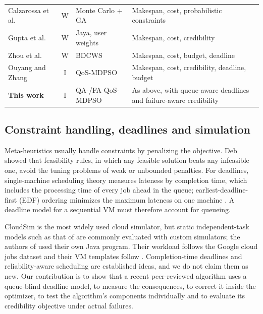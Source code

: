\documentclass[pdflatex,sn-basic]{sn-jnl}
\theoremstyle{thmstyleone}%
\theoremstyle{thmstyletwo}%
\theoremstyle{thmstylethree}%
\begin{document}
\begin{table}[!t]
\begin{tabular}{@{}p{2.9cm}cp{3.0cm}p{3.7cm}@{}}
Calzarossa et al.\ \citeyearpar{calzarossa2021} & W & Monte Carlo + GA & Makespan, cost, probabilistic constraints\\
Gupta et al.\ \citeyearpar{gupta2021} & W & Jaya, user weights & Makespan, cost, credibility\\
Zhou et al.\ \citeyearpar{zhou2023} & W & BDCWS & Makespan, cost, budget, deadline\\
Ouyang and Zhang \citeyearpar{ouyang2025} & I & QoS-MDPSO & Makespan, cost, credibility, deadline, budget\\
\textbf{This work} & I & QA-/FA-QoS-MDPSO & As above, with queue-aware deadlines and failure-aware credibility\\
\bottomrule
\end{tabular}
\end{table}

\subsection{Constraint handling, deadlines and simulation}\label{sec2.5}
Meta-heuristics usually handle constraints by penalizing the objective. Deb \citeyearpar{deb2000} showed that feasibility rules, in which any feasible solution beats any infeasible one, avoid the tuning problems of weak or unbounded penalties. For deadlines, single-machine scheduling theory measures lateness by completion time, which includes the processing time of every job ahead in the queue; earliest-deadline-first (EDF) ordering minimizes the maximum lateness on one machine \citep{jackson1955}. A deadline model for a sequential VM must therefore account for queueing.

CloudSim \citep{calheiros2011} is the most widely used cloud simulator, but static independent-task models such as that of \citet{ouyang2025} are commonly evaluated with custom simulators; the authors of \citet{ouyang2025} used their own Java program. Their workload follows the Google cloud jobs dataset \citep{hussain2018} and their VM templates follow \citep{guo2017}. Completion-time deadlines and reliability-aware scheduling are established ideas, and we do not claim them as new. Our contribution is to show that a recent peer-reviewed algorithm uses a queue-blind deadline model, to measure the consequences, to correct it inside the optimizer, to test the algorithm's components individually and to evaluate its credibility objective under actual failures.

\end{document}
